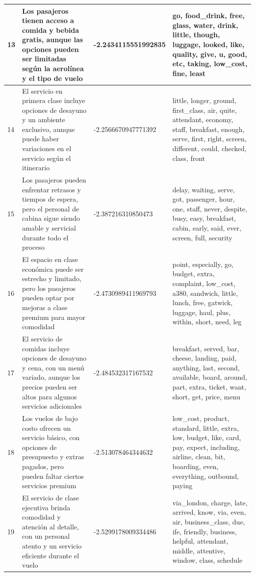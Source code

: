 \documentclass{report}
\begin{document}
{\begin{longtable}{|p{1cm}|p{4cm}|p{4cm}|p{6cm}|}
                    \hline
                    13 & Los pasajeros tienen acceso a comida y bebida gratis, aunque las opciones pueden ser limitadas según la aerolínea y el tipo de vuelo & -2.2434115551992835 & go, food\_drink, free, glass, water, drink, little, though, luggage, looked, like, quality, give, u, good, etc, taking, low\_cost, fine, least \\
                    \hline
                    14 & El servicio en primera clase incluye opciones de desayuno y un ambiente exclusivo, aunque puede haber variaciones en el servicio según el itinerario & -2.2566670947771392 & little, longer, ground, first\_class, air, quite, attendant, economy, staff, breakfast, enough, serve, first, right, screen, different, could, checked, class, front \\
                    \hline
                    15 & Los pasajeros pueden enfrentar retrasos y tiempos de espera, pero el personal de cabina sigue siendo amable y servicial durante todo el proceso & -2.387216310850473 & delay, waiting, serve, got, passenger, hour, one, staff, never, despite, busy, easy, breakfast, cabin, early, said, ever, screen, full, security \\
                    \hline
                    16 & El espacio en clase económica puede ser estrecho y limitado, pero los pasajeros pueden optar por mejoras a clase premium para mayor comodidad & -2.4730989411969793 & point, especially, go, budget, extra, complaint, low\_cost, a380, sandwich, little, lunch, free, gatwick, luggage, haul, plus, within, short, need, leg \\
                    \hline
                    17 & El servicio de comidas incluye opciones de desayuno y cena, con un menú variado, aunque los precios pueden ser altos para algunos servicios adicionales & -2.484532317167532 & breakfast, served, bar, cheese, landing, paid, anything, last, second, available, board, around, part, extra, ticket, want, short, get, price, menu \\
                    \hline
                    18 & Los vuelos de bajo costo ofrecen un servicio básico, con opciones de presupuesto y extras pagados, pero pueden faltar ciertos servicios premium & -2.513078464344632 & low\_cost, product, standard, little, extra, low, budget, like, card, pay, expect, including, airline, clean, bit, boarding, even, everything, outbound, paying \\
                    \hline
                    19 & El servicio de clase ejecutiva brinda comodidad y atención al detalle, con un personal atento y un servicio eficiente durante el vuelo & -2.5299178009334486 & via\_london, charge, late, arrived, know, via, even, air, business\_class, due, ife, friendly, business, helpful, attendant, middle, attentive, window, class, schedule \\

\end{longtable}}
\end{document}
